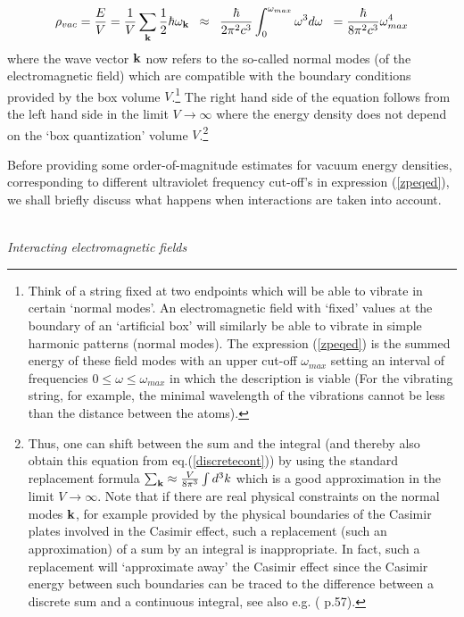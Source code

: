 \documentclass[12pt]{article}
\newcommand{\beq}{\begin{equation}}
\newcommand{\eeq}{\end{equation}}
\begin{document}
\beq \label{zpeqed}
\rho_{vac} = \frac{E}{V} = 
\frac{1}{V} \sum_{\bf k} \frac{1}{2} \hbar \omega_{\bf k} 
\; \; \approx \; \; \frac{\hbar}{2 \pi^2 c^3}
 \int _{0}^{\omega_{max}} \omega ^3 d\omega
\; \; = \frac{\hbar}{8 \pi^2 c^3}  \omega _{max}^4 
\eeq
where the wave vector ${\bf k}$ now refers to the so-called normal
modes (of the electromagnetic field) which are compatible with the
boundary conditions provided by the box volume $V$.\footnote{Think
of a string fixed at two endpoints which will be able to vibrate
in certain `normal modes'. An electromagnetic field with `fixed'
values at the boundary of an `artificial box' will similarly be
able to vibrate in simple harmonic patterns (normal modes). The
expression (\ref{zpeqed}) is the summed energy of these field
modes with an upper cut-off $\omega_{max}$ setting an interval of
frequencies $0 \leq \omega \leq \omega_{max}$ in which the
description is viable (For the vibrating string, for example, the
minimal wavelength of the vibrations cannot be less than the
distance between the atoms).} The right hand side of the equation
follows from the left hand side in the limit $V \rightarrow
\infty$ where the energy density does not depend on the `box
quantization' volume $V$.\footnote{Thus, one can shift between the
sum and the integral (and thereby also obtain this equation from
eq.(\ref{discretecont})) by using the standard replacement formula
$\sum_{\bf{k}} \approx \frac{V}{8\pi^3} \int d^3 k$ which is a
good approximation in the limit $V \rightarrow \infty$. Note that
if there are real physical constraints on the normal modes ${\bf
k}$, for example provided by the physical boundaries of the
Casimir plates involved in the Casimir effect, such a replacement
(such an approximation) of a sum by an integral is
inappropriate. In fact, such a replacement will `approximate away'
the Casimir effect since the Casimir energy between such
boundaries can be traced to the difference between a discrete sum
and a continuous integral, see also e.g. (\cite{milonni94} p.57).}

Before providing some order-of-magnitude
estimates for vacuum energy densities, corresponding to 
different ultraviolet frequency cut-off's in expression (\ref{zpeqed}), 
we shall briefly discuss what happens when interactions 
are taken into account. 

\ \\
{\em Interacting electromagnetic fields}
\end{document}

